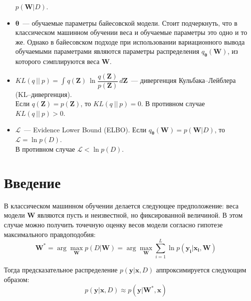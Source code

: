 \documentclass{article}
\newcommand{\argmax}{\arg\!\max}
\numberwithin{equation}{section}
\begin{document}
\begin{itemize}
            $p(\pmb{W}| D)$.
        \item $\pmb{\theta}$~--- обучаемые параметры байесовской модели.
            Стоит подчеркнуть, что в классическом машинном обучении веса и обучаемые параметры это одно и то же.
            Однако в байесовском подходе при использовании вариационного вывода
            обучаемыми параметрами являются параметры распределения $q_{\pmb{\theta}}(\pmb{W})$,
            из которого сэмплируются веса $\pmb{W}$.
        \item $
                KL(q~||~p)
                =
                \int_{}{
                    q(\pmb{Z})
                    \,
                    \ln{
                        \dfrac
                            {q(\pmb{Z})}
                            {p(\pmb{Z})}
                    }
                    \,
                    d\pmb{Z}
                }
            $~--- дивергенция Кульбака--Лейблера (KL--дивергенция). \\
            Если $q(\pmb{Z}) = p(\pmb{Z})$, то $KL(q~||~p) = 0$.
            В противном случае $KL(q~||~p) > 0$.
        \item
            $\mathcal{L}$~--- Evidence Lower Bound (ELBO).
            Если $q_{\pmb{\theta}}(\pmb{W}) = p(\pmb{W}| D)$, то $\mathcal{L} = \ln{p(D)}$. \\
            В противном случае $\mathcal{L} < \ln{p(D)}$.
    \end{itemize}
    \section{Введение}

    В классическом машинном обучении делается следующее предположение:
    веса модели $\pmb{W}$ являются пусть и неизвестной, но фиксированной величиной.
    В этом случае можно получить точечную оценку весов модели согласно гипотезе максимального правдоподобия:
    \begin{equation}\label{max_likelihood}
        \pmb{W}^*
        =
        \argmax_{\pmb{W}} p(D | \pmb{W})
        =
        \argmax_{\pmb{W}} {
            \sum_{i=1}^{L}{
                \ln{
                    p(\pmb{y_{i}} | \pmb{x_{i}}, \pmb{W})
                }
            }
        }
    \end{equation}

    Тогда предсказательное распределение $p(\pmb{y} | \pmb{x}, D)$ аппроксимируется следующим образом:
    \begin{equation}
        p(\pmb{y} | \pmb{x}, D) \approx p(\pmb{y} |\pmb{W}^*, \pmb{x})
    \end{equation}
\end{document}
